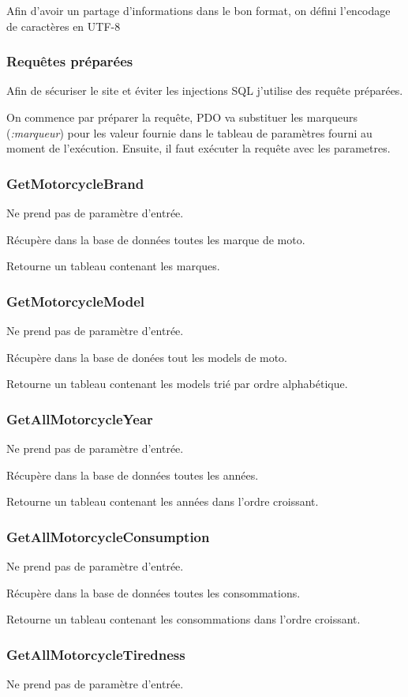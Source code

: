 \documentclass[a4paper]{article}
\begin{document}
Afin d'avoir un partage d'informations dans le bon format, on défini l'encodage de caractères en UTF-8

\subsubsection{Requêtes préparées}
Afin de sécuriser le site et éviter les injections SQL j'utilise des requête préparées.

On commence par préparer la requête, PDO va substituer les marqueurs (\emph{:marqueur}) pour les valeur fournie dans le tableau de paramètres fourni au moment de l'exécution. Ensuite, il faut exécuter la requête avec les parametres.

\subsubsection{GetMotorcycleBrand}
Ne prend pas de paramètre d'entrée.

Récupère dans la base de données toutes les marque de moto.

Retourne un tableau contenant les marques.
\subsubsection{GetMotorcycleModel}
Ne prend pas de paramètre d'entrée.

Récupère dans la base de donées tout les models de moto.

Retourne un tableau contenant les models trié par ordre alphabétique.
\subsubsection{GetAllMotorcycleYear}
Ne prend pas de paramètre d'entrée.

Récupère dans la base de données toutes les années.

Retourne un tableau contenant les années dans l'ordre croissant.
\subsubsection{GetAllMotorcycleConsumption}
Ne prend pas de paramètre d'entrée.

Récupère dans la base de données toutes les consommations.

Retourne un tableau contenant les consommations dans l'ordre croissant.
\subsubsection{GetAllMotorcycleTiredness}
Ne prend pas de paramètre d'entrée.
\end{document}
